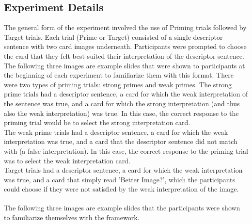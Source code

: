 \documentclass[]{article}
\begin{document}
\subsection*{Experiment Details}
The general form of the experiment involved the use of Priming trials followed by Target trials. Each trial (Prime or Target) consisted of a single descriptor sentence with two card images underneath. Participants were prompted to choose the card that they felt best suited their interpretation of the descriptor sentence.\\
The following three images are example slides that were shown to participants at the beginning of each experiment to familiarize them with this format.
There were two types of priming trials: strong primes and weak primes. The strong prime trials had a descriptor sentence, a card for which the weak interpretation of the sentence was true, and a card for which the strong interpretation (and thus also the weak interpretation) was true. In this case, the correct response to the priming trial would be to select the strong interpretation card.\\
The weak prime trials had a descriptor sentence, a card for which the weak interpretation was true, and a card that the descriptor sentence did not match with (a false interpretation). In this case, the correct response to the priming trial was to select the weak interpretation card.\\
Target trials had a descriptor sentence, a card for which the weak interpretation was true, and a card that simply read 'Better Image?', which the participants could choose if they were not satisfied by the weak interpretation of the image.\\
\\
The following three images are example slides that the participants were shown to familiarize themselves with the framework.\\
\end{document}
